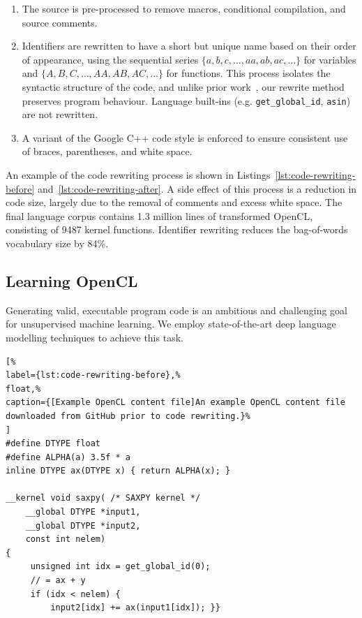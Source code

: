 \begin{enumerate}
  \item The source is pre-processed to remove macros, conditional compilation, and source comments.
  \item Identifiers are rewritten to have a short but unique name based on their order of appearance, using the sequential series $\{a,\allowbreak b,\allowbreak c,\allowbreak \ldots,\allowbreak aa,\allowbreak ab,\allowbreak ac,\allowbreak \ldots\}$ for variables and $\{A,\allowbreak B,\allowbreak C,\allowbreak \ldots,\allowbreak AA,\allowbreak AB,\allowbreak AC,\allowbreak \ldots\}$ for functions. This process isolates the syntactic structure of the code, and unlike prior work~\cite{Allamanis2013a}, our rewrite method preserves program behaviour. Language built-ins (e.g. \texttt{get\_global\_id}, \texttt{asin}) are not rewritten.
  \item A variant of the Google C++ code style is enforced to ensure consistent use of braces, parentheses, and white space.
\end{enumerate}

An example of the code rewriting process is shown in Listings~\ref{lst:code-rewriting-before} and~\ref{lst:code-rewriting-after}. A side effect of this process is a reduction in code size, largely due to the removal of comments and excess white space. The final language corpus contains 1.3 million lines of transformed OpenCL, consisting of 9487 kernel functions. Identifier rewriting reduces the bag-of-words vocabulary size by 84\%.

\subsection{Learning OpenCL}
\label{sec:learning-opencl}

Generating valid, executable program code is an ambitious and challenging goal for unsupervised machine learning. We employ state-of-the-art deep language modelling techniques to achieve this task.

\lstset{language=[OpenCL]C}
\begin{lstlisting}[%
label={lst:code-rewriting-before},%
float,%
caption={[Example OpenCL content file]An example OpenCL content file downloaded from GitHub prior to code rewriting.}%
]
#define DTYPE float
#define ALPHA(a) 3.5f * a
inline DTYPE ax(DTYPE x) { return ALPHA(x); }

__kernel void saxpy( /* SAXPY kernel */
    __global DTYPE *input1,
    __global DTYPE *input2,
    const int nelem)
{
     unsigned int idx = get_global_id(0);
     // = ax + y
     if (idx < nelem) {
         input2[idx] += ax(input1[idx]); }}
\end{lstlisting}

